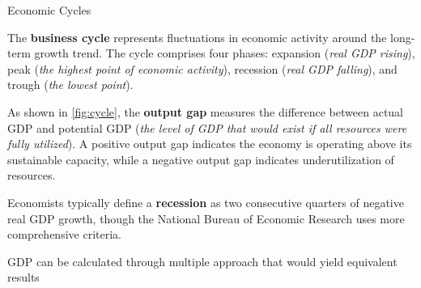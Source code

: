 \documentclass[10pt]{article}
\begin{document}
    \begin{core}{Economic Cycles}

      The \textbf{business cycle} represents fluctuations in economic activity around the long-term growth trend. The cycle comprises four phases: expansion (\textit{real GDP rising}), peak (\textit{the highest point of economic activity}), recession (\textit{real GDP falling}), and trough (\textit{the lowest point}).


      As shown in \autoref{fig:cycle}, the \textbf{output gap} measures the difference between actual GDP and potential GDP (\textit{the level of GDP that would exist if all resources were fully utilized}). A positive output gap indicates the economy is operating above its sustainable capacity, while a negative output gap indicates underutilization of resources.

      Economists typically define a \textbf{recession} as two consecutive quarters of negative real GDP growth, though the National Bureau of Economic Research uses more comprehensive criteria.

    \end{core}

    GDP can be calculated through multiple approach that would yield equivalent results
\end{document}
